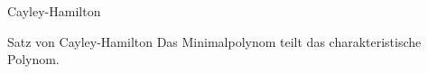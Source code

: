 \documentclass[class=article, crop=false]{standalone}
\begin{document}
\begin{zettel}{Cayley-Hamilton}

\begin{flashcard}{Satz von Cayley-Hamilton}
	Das Minimalpolynom teilt das charakteristische Polynom.
\end{flashcard}

\end{zettel}
\end{document}
